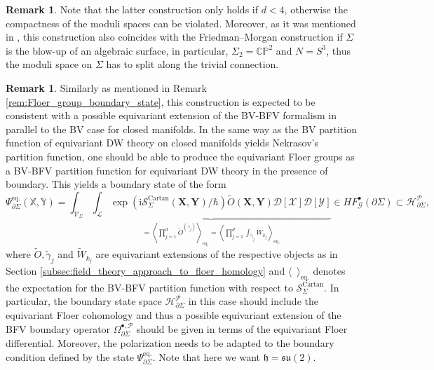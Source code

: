\documentclass[11pt,colorinlistoftodos]{amsart}
\numberwithin{equation}{subsection}
\theoremstyle{plain}
\theoremstyle{definition}
\newtheorem{rem}[thm]{Remark}
\theoremstyle{remark}
\newcommand{\C}{\mathbb{C}}
\newcommand{\de}{\partial}
\newcommand{\calH}{\mathcal{H}}
\newcommand{\calS}{\mathcal{S}}
\newcommand{\calG}{\mathcal{G}}
\newcommand{\calL}{\mathcal{L}}
\newcommand{\calP}{\mathcal{P}}
\newcommand{\I}{\mathrm{i}}
\newcommand{\calV}{\mathcal{V}}
\begin{document}
\begin{rem}
Note that the latter construction only holds if $d<4$, otherwise the compactness of the moduli spaces can be violated. Moreover, as it was mentioned in \cite{AustinBraam1996}, this construction also coincides with the Friedman--Morgan construction \cite{FriedmanMorgan1994} if $\Sigma$ is the blow-up of an algebraic surface, in particular, $\Sigma_2=\C \mathbb{P}^2$ and $N=S^3$, thus the moduli space on $\Sigma$ has to split along the trivial connection.
\end{rem}


\begin{rem}
Similarly as mentioned in Remark \ref{rem:Floer_group_boundary_state}, this construction is expected to be consistent with a possible equivariant extension of the BV-BFV formalism in parallel to the BV case for closed manifolds. In the same way as the BV partition function of equivariant DW theory on closed manifolds yields Nekrasov's partition function, one should be able to produce the equivariant Floer groups as a BV-BFV partition function for equivariant DW theory in the presence of boundary. This yields a boundary state of the form
\[
\Psi^\mathrm{eq.}_{\de\Sigma}(\mathds{X},\mathds{Y})=\int_{\calV_\Sigma}\underbrace{\int_{\calL}\exp(\I\calS^\mathrm{Cartan}_\Sigma(\mathbf{X},\mathbf{Y})/\hbar)\widetilde{O}(\mathbf{X},\mathbf{Y})\mathscr{D}[\mathscr{X}]\mathscr{D}[\mathscr{Y}]}_{=\left\langle\prod_{j=1}^d\widetilde{O}^{(\gamma_j)}\right\rangle_\mathrm{eq.}=\left\langle \prod_{j=1}^d\int_{\widetilde{\gamma}_j}\widetilde{W}_{k_j}\right\rangle_\mathrm{eq.}}\in HF_\calG^\bullet(\de\Sigma)\subset\calH^\calP_{\de\Sigma},
\]
where $\widetilde{O},\widetilde{\gamma}_j$ and $\widetilde{W}_{k_j}$ are equivariant extensions of the respective objects as in Section \ref{subsec:field_theory_approach_to_floer_homology} and $\langle\enspace\rangle_\mathrm{eq.}$ denotes the expectation for the BV-BFV partition function with respect to $\calS^\mathrm{Cartan}_\Sigma$.
In particular, the boundary state space $\calH^\calP_{\de\Sigma}$ in this case should include the equivariant Floer cohomology and thus a possible equivariant extension of the BFV boundary operator $\Omega^{\bullet,\calP}_{\de\Sigma}$ should be given in terms of the equivariant Floer differential. Moreover, the polarization needs to be adapted to the boundary condition defined by the state $\Psi^\mathrm{eq.}_{\de\Sigma}$. Note that here we want $\mathfrak{h}=\mathfrak{su}(2)$. 
\end{rem}
\end{document}
